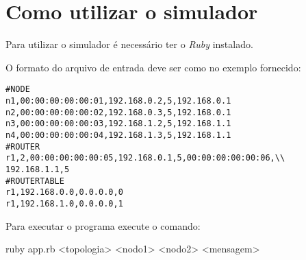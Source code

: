 \section{Como utilizar o simulador}

Para utilizar o simulador é necessário ter o \emph{Ruby} instalado.

O formato do arquivo de entrada deve ser como no exemplo fornecido:

\begin{lstlisting}
#NODE
n1,00:00:00:00:00:01,192.168.0.2,5,192.168.0.1
n2,00:00:00:00:00:02,192.168.0.3,5,192.168.0.1
n3,00:00:00:00:00:03,192.168.1.2,5,192.168.1.1
n4,00:00:00:00:00:04,192.168.1.3,5,192.168.1.1
#ROUTER
r1,2,00:00:00:00:00:05,192.168.0.1,5,00:00:00:00:00:06,\\ 192.168.1.1,5
#ROUTERTABLE
r1,192.168.0.0,0.0.0.0,0
r1,192.168.1.0,0.0.0.0,1
\end{lstlisting}

Para executar o programa execute o comando:

\begin{verb}
ruby app.rb <topologia> <nodo1> <nodo2> <mensagem>
\end{verb}


